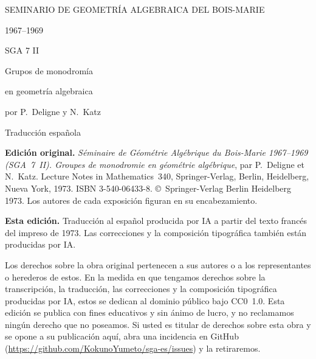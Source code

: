 
\thispagestyle{empty}
\begin{center}
\vspace*{2.5cm}
{\large SEMINARIO DE GEOMETRÍA ALGEBRAICA DEL BOIS-MARIE\par}
\medskip
{\large 1967--1969\par}
\vspace{2.2cm}
{\Huge SGA 7 II\par}
\vspace{1.2cm}
{\LARGE Grupos de monodromía\par}
\smallskip
{\LARGE en geometría algebraica\par}
\vspace{2.2cm}
{\large por P.~Deligne y N.~Katz\par}
\vspace{3.5cm}
{\large Traducción española\par}
\medskip
{\par}
\end{center}
\clearpage

\thispagestyle{empty}
\null\vfill
\begingroup\small
\noindent\textbf{Edición original.} \textit{Séminaire de Géométrie Algébrique du Bois-Marie 1967--1969 (SGA~7~II).
Groupes de monodromie en géométrie algébrique}, par P.~Deligne et N.~Katz. Lecture Notes in Mathematics~340,
Springer-Verlag, Berlin, Heidelberg, Nueva York, 1973. ISBN 3-540-06433-8. \copyright{}~Springer-Verlag Berlin
Heidelberg 1973. Los autores de cada exposición figuran en su encabezamiento.\par
\medskip
\noindent\textbf{Esta edición.} Traducción al español producida por IA a partir del texto francés del impreso de
1973. Las correcciones y la composición tipográfica también están producidas por IA. \par
\medskip
\noindent Los derechos sobre la obra original pertenecen a sus autores o a los representantes o herederos de estos.
En la medida en que tengamos derechos sobre la transcripción, la traducción, las correcciones y la composición
tipográfica producidas por IA, estos se dedican al dominio público bajo CC0~1.0. Esta edición se publica con fines
educativos y sin ánimo de lucro, y no reclamamos ningún derecho que no poseamos. Si usted es titular de derechos sobre
esta obra y se opone a su publicación aquí, abra una incidencia en GitHub
(\url{https://github.com/KokunoYumeto/sga-es/issues}) y la retiraremos.\par
\endgroup
\clearpage
